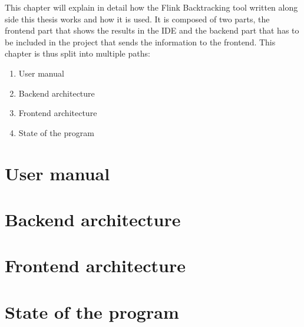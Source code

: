 This chapter will explain in detail how the Flink Backtracking tool written along side this thesis works and how it is used. It is composed of two parts, the frontend part that shows the results in the IDE and the backend part that has to be included in the project that sends the information to the frontend. This chapter is thus split into multiple paths:
\begin{enumerate}
  \item[\ref{fbManual}] User manual
  \item[\ref{fbBackend}] Backend architecture
  \item[\ref{fbFrontend}] Frontend architecture
  \item[\ref{fbState}] State of the program
\end{enumerate}

\section{User manual}
\label{fbManual}


\section{Backend architecture}
\label{fbBackend}


\section{Frontend architecture}
\label{fbFrontend}


\section{State of the program}
\label{fbState}
